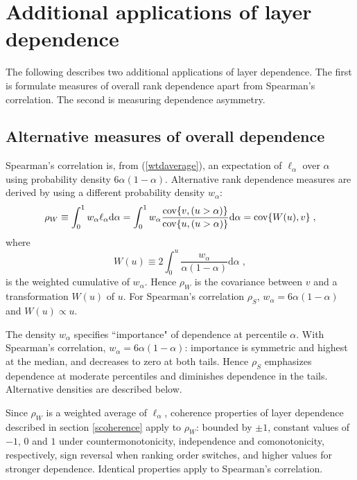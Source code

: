 \documentclass[authoryear]{elsarticle}
\newcommand{\cov}{{\rm cov}}
\newcommand{\de}{\mathrm{d}}
\newcommand{\eref}[1]{(\ref{#1})}
\newcommand{\aref}[1]{\ref{#1}}
\begin{document}
\section{Additional applications of layer dependence}\label{sapplication}

The following describes two additional applications of layer dependence. The first is formulate measures of overall rank dependence apart from Spearman's correlation. The second is measuring dependence asymmetry.


\subsection{Alternative measures of overall dependence}


Spearman's correlation is, from \eref{wtdaverage}, an expectation of $\ell_\alpha$ over $\alpha$ using probability density $6\alpha(1-\alpha)$. Alternative rank dependence measures are derived by using a different probability density $w_\alpha$:
$$
\rho_W\equiv  \int_0^1 w_\alpha \ell_\alpha \de \alpha = \int_0^1 w_\alpha \frac{ \cov\{v,(u>\alpha)\}}{\cov\{u,(u>\alpha)\}} \de \alpha=\cov\{W(u),v\} \;,
$$
where
$$
W(u)\equiv 2\int_0^u \frac{w_\alpha}{\alpha(1-\alpha)}\de\alpha \;,
$$
is the weighted cumulative of $w_\alpha$. Hence $\rho_W$  is the covariance between $v$ and a transformation $W(u)$ of $u$.  For Spearman's correlation $\rho_S$, $w_\alpha=6\alpha(1-\alpha)$ and $W(u)\propto u$.

The density $w_\alpha$ specifies ``importance" of dependence at percentile $\alpha$. With Spearman's correlation, $w_\alpha=6\alpha(1-\alpha)$: importance is symmetric and highest at the median, and decreases to zero at both tails. Hence $\rho_S$ emphasizes dependence at moderate percentiles and diminishes dependence in the tails. Alternative densities are described below.

Since $\rho_W$ is a weighted average of $\ell_\alpha$, coherence properties of layer dependence described in section \aref{scoherence} apply to $\rho_W$: bounded by $\pm 1$, constant values of $-1$, $0$ and $1$ under countermonotonicity, independence and comonotonicity, respectively, sign reversal when ranking order switches, and higher values for stronger dependence. Identical properties apply to Spearman's correlation.
\end{document}
